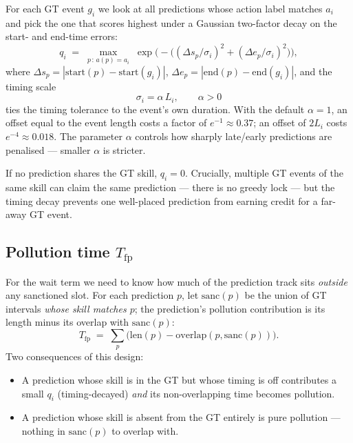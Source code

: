\documentclass[11pt]{article}
\newcommand{\Tfp}{T_{\text{fp}}}
\newcommand{\qi}{q_i}
\begin{document}
For each GT event $g_i$ we look at all predictions whose action label
matches $a_i$ and pick the one that scores highest under a Gaussian
two-factor decay on the start- and end-time errors:
\begin{equation}
  \qi \;=\; \max_{p \,:\, a(p) = a_i}\;
            \exp\!\bigl(-\bigl((\Delta s_p / \sigma_i)^2
                              + (\Delta e_p / \sigma_i)^2\bigr)\bigr),
  \label{eq:qi}
\end{equation}
where $\Delta s_p = |\mathrm{start}(p) - \mathrm{start}(g_i)|$,
$\Delta e_p = |\mathrm{end}(p) - \mathrm{end}(g_i)|$, and the timing
scale
\begin{equation}
  \sigma_i = \alpha\,L_i, \qquad \alpha > 0
  \label{eq:sigma}
\end{equation}
ties the timing tolerance to the event's own duration. With the
default $\alpha = 1$, an offset equal to the event length costs a
factor of $e^{-1} \approx 0.37$; an offset of $2L_i$ costs $e^{-4}
\approx 0.018$. The parameter $\alpha$ controls how sharply
late/early predictions are penalised --- smaller $\alpha$ is stricter.

If no prediction shares the GT skill, $\qi = 0$. Crucially, multiple
GT events of the same skill can claim the same prediction --- there
is no greedy lock --- but the timing decay prevents one well-placed
prediction from earning credit for a far-away GT event.

\subsection{Pollution time $\Tfp$}
\label{sec:fp}

For the wait term we need to know how much of the prediction track
sits \emph{outside} any sanctioned slot. For each prediction $p$,
let $\mathrm{sanc}(p)$ be the union of GT intervals \emph{whose skill
matches $p$}; the prediction's pollution contribution is its length
minus its overlap with $\mathrm{sanc}(p)$:
\begin{equation}
  \Tfp \;=\; \sum_{p}\bigl(\mathrm{len}(p)
                         - \mathrm{overlap}(p, \mathrm{sanc}(p))\bigr).
  \label{eq:Tfp}
\end{equation}
Two consequences of this design:
\begin{itemize}
  \item A prediction whose skill is in the GT but whose timing is off
    contributes a small $\qi$ (timing-decayed) \emph{and} its
    non-overlapping time becomes pollution.
  \item A prediction whose skill is absent from the GT entirely is
    pure pollution --- nothing in $\mathrm{sanc}(p)$ to overlap with.
\end{itemize}
\end{document}
